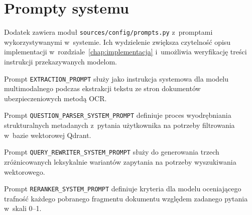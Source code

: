 \chapter{Prompty systemu}\label{app:prompty}

Dodatek zawiera moduł \texttt{sources/config/prompts.py} z~promptami
wykorzystywanymi w~systemie. Ich wydzielenie zwiększa czytelność opisu
implementacji w~rozdziale~\ref{chap:implementacja} i~umożliwia weryfikację
treści instrukcji przekazywanych modelom.


Prompt \texttt{EXTRACTION\_PROMPT} służy jako instrukcja systemowa dla modelu
multimodalnego podczas ekstrakcji tekstu ze stron dokumentów ubezpieczeniowych
metodą OCR.



Prompt \texttt{QUESTION\_PARSER\_SYSTEM\_PROMPT} definiuje proces wyodrębniania
strukturalnych metadanych z~pytania użytkownika na potrzeby filtrowania w~bazie
wektorowej Qdrant.



Prompt \texttt{QUERY\_REWRITER\_SYSTEM\_PROMPT} służy do generowania trzech
zróżnicowanych leksykalnie wariantów zapytania na potrzeby wyszukiwania
wektorowego.



Prompt \texttt{RERANKER\_SYSTEM\_PROMPT} definiuje kryteria dla modelu
oceniającego trafność każdego pobranego fragmentu dokumentu względem zadanego
pytania w~skali 0--1.


